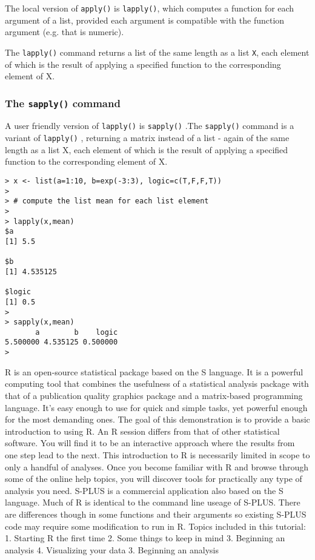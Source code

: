 \documentclass[a4paper,12pt]{article}
\begin{document}
The local version of \texttt{apply()} is \texttt{lapply()}, which computes a function for each 
argument of a list, provided each argument is compatible with the function argument (e.g. that is numeric).

The \texttt{lapply()} command returns a list of the same length as a list \texttt{X}, each 
element of which is the result of applying a specified function to 
the corresponding element of X.

\subsubsection{The \texttt{sapply()} command}
A user friendly version of  \texttt{lapply()}  is  \texttt{sapply()} .The \texttt{sapply()} command  is a variant of \texttt{lapply()} , returning a matrix 
instead of a list - again of the same length as a list X, 
each element of which is the result of applying a specified function to the
 corresponding element of X.
\begin{verbatim}
> x <- list(a=1:10, b=exp(-3:3), logic=c(T,F,F,T))
>
> # compute the list mean for each list element
>
> lapply(x,mean)
$a
[1] 5.5

$b
[1] 4.535125

$logic
[1] 0.5
>
> sapply(x,mean)
       a        b    logic
5.500000 4.535125 0.500000
>
\end{verbatim}






R is an open-source statistical package based on the S language. It is a powerful computing tool that combines the usefulness of a statistical analysis package with that of a publication quality graphics package and a matrix-based programming language. It's easy enough to use for quick and simple tasks, yet powerful enough for the most demanding ones. The goal of this demonstration is to provide a basic introduction to using R. An R session differs from that of other statistical software. You will find it to be an interactive approach where the results from one step lead to the next. This introduction to R is necessarily limited in scope to only a handful of analyses. Once you become familiar with R and browse through some of the online help topics, you will discover tools for practically any type of analysis you need. S-PLUS is a commercial application also based on the S language. Much of R is identical to the command line useage of S-PLUS. There are differences though in some functions and their arguments so existing S-PLUS code may require some modification to run in R. 
Topics included in this tutorial: 
1. Starting R the first time
2. Some things to keep in mind
3. Beginning an analysis
4. Visualizing your data
3. Beginning an analysis
\end{document}
